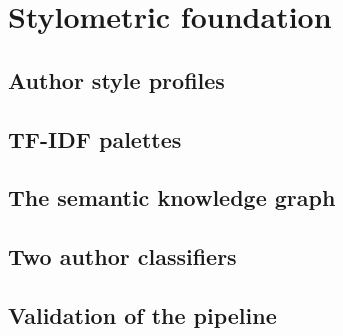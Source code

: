 \chapter{Stylometric foundation}\label{ch:stylometry}

\section{Author style profiles}

\section{TF-IDF palettes}

\section{The semantic knowledge graph}

\section{Two author classifiers}

\section{Validation of the pipeline}
